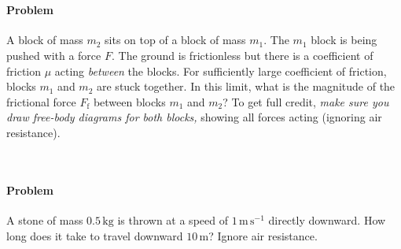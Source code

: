 \documentclass[12pt]{article}
\newcommand{\kg}{\mathrm{kg}}
\newcommand{\m}{\mathrm{m}}
\newcommand{\s}{\mathrm{s}}
\newcommand{\mps}{\m\,\s^{-1}}
\newcounter{problem}
\begin{document}
~ \vfill ~

\paragraph{Problem~\theproblem}%
A block of mass $m_2$ sits on top of a block of mass $m_1$.  The $m_1$
block is being pushed with a force $F$.  The ground is frictionless
but there is a coefficient of friction $\mu$ acting \emph{between} the
blocks.  For sufficiently large coefficient of friction, blocks $m_1$
and $m_2$ are stuck together.  In this limit, what is the magnitude of
the frictional force $F_\mathrm{f}$ between blocks $m_1$ and $m_2$?
To get full credit, \emph{make sure you draw free-body diagrams for
both blocks,} showing all forces acting (ignoring air resistance).
%

~ \vfill ~

\clearpage

\paragraph{Problem~\theproblem}%
A stone of mass $0.5\,\kg$ is thrown at a speed of $1\,\mps$ directly
downward.  How long does it take to travel downward $10\,\m$?  Ignore
air resistance.

~ \vfill ~
\end{document}

